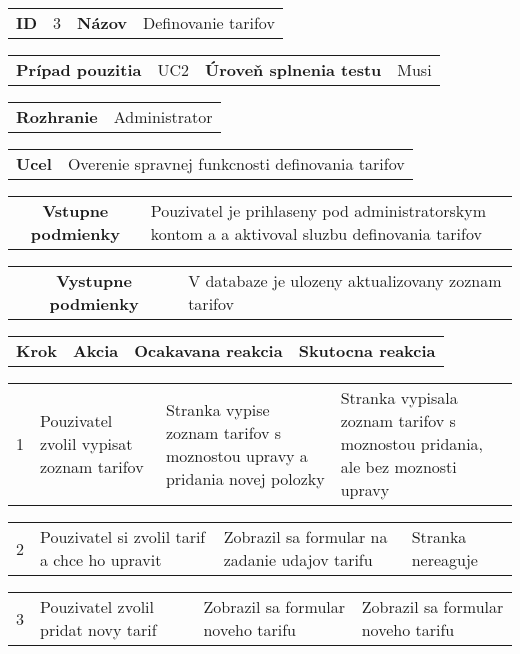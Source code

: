 \begin{table}[h]
  \centering
  \begin{tabularx}{\mytablewidth}{|c|c|c|X|} 
      \hline 
      \textbf{ID} & 3 & \textbf{Názov} & Definovanie tarifov
  \end{tabularx}

  \begin{tabularx}{\mytablewidth}{|c|c|c|X|} 
      \hline 
      \textbf{Prípad pouzitia} & UC2 & \textbf{Úroveň splnenia testu} & Musi
  \end{tabularx}

  \begin{tabularx}{\mytablewidth}{|c|X|} 
      \hline 
      \textbf{Rozhranie} & Administrator
  \end{tabularx}

  \begin{tabularx}{\mytablewidth}{|c|X|} 
      \hline 
      \textbf{Ucel} & Overenie spravnej funkcnosti definovania tarifov
  \end{tabularx}

  \begin{tabularx}{\mytablewidth}{|c|X|} 
      \hline 
      \textbf{Vstupne podmienky} & Pouzivatel je prihlaseny pod administratorskym kontom a 
                                   a aktivoval sluzbu definovania tarifov
  \end{tabularx}

  \begin{tabularx}{\mytablewidth}{|c|X|} 
      \hline 
      \textbf{Vystupne podmienky} & V databaze je ulozeny aktualizovany zoznam tarifov
  \end{tabularx}

  \begin{tabularx}{\mytablewidth}{|p{2em}|X|X|X|} 
      \hline 
      \textbf{Krok} & \textbf{Akcia} & \textbf{Ocakavana reakcia} & \textbf{Skutocna reakcia}
  \end{tabularx}

  \begin{tabularx}{\mytablewidth}{|p{2em}|X|X|X|} 
      \hline 
      1 & 
      Pouzivatel zvolil vypisat zoznam tarifov & 
      Stranka vypise zoznam tarifov s moznostou upravy a pridania novej polozky & 
      Stranka vypisala zoznam tarifov s moznostou pridania, ale bez moznosti upravy
  \end{tabularx}
  \begin{tabularx}{\mytablewidth}{|p{2em}|X|X|X|} 
      \hline 
      2 & 
      Pouzivatel si zvolil tarif a chce ho upravit & 
      Zobrazil sa formular na zadanie udajov tarifu& 
      Stranka nereaguje
  \end{tabularx}
  \begin{tabularx}{\mytablewidth}{|p{2em}|X|X|X|} 
      \hline 
      3 & 
      Pouzivatel zvolil pridat novy tarif& 
      Zobrazil sa formular noveho tarifu & 
      Zobrazil sa formular noveho tarifu
  \end{tabularx}
  \begin{tabularx}{\mytablewidth}{|X|} 
      \hline
  \end{tabularx}
\end{table}


